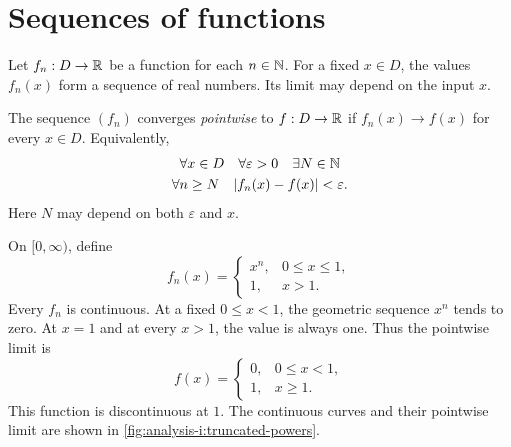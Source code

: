 \section{Sequences of functions}
\label{sec:analysis-i:sequences-of-functions}

Let $f_n:D\to\mathbb{R}$ be a function for each $n\in\mathbb{N}$. For a fixed $x\in D$,
the values $f_n(x)$ form a sequence of real numbers. Its limit may depend
on the input $x$.

\begin{definition}
  \label{thm:analysis-i:pointwise-convergence}
  The sequence $(f_n)$ converges \emph{pointwise} to $f:D\to\mathbb{R}$ if
  $f_n(x)\to f(x)$ for every $x\in D$. Equivalently,
  \[
    \begin{gathered}
      \forall x\in D\quad\forall\varepsilon>0\quad\exists N\in\mathbb{N}\\
      \forall n\ge N\quad |f_n(x)-f(x)|<\varepsilon.
    \end{gathered}
  \]
  Here $N$ may depend on both $\varepsilon$ and $x$.
\end{definition}

\begin{example}
  \label{ex:analysis-i:truncated-powers}
  On $[0,\infty)$, define
  \[
    f_n(x)=
    \begin{cases}
      x^n,&0\le x\le1,\\
      1,&x>1.
    \end{cases}
  \]
  Every $f_n$ is continuous. At a fixed $0\le x<1$, the geometric
  sequence $x^n$ tends to zero. At $x=1$ and at every $x>1$, the value
  is always one. Thus the pointwise limit is
  \[
    f(x)=
    \begin{cases}
      0,&0\le x<1,\\
      1,&x\ge1.
    \end{cases}
  \]
  This function is discontinuous at $1$. The continuous curves and
  their pointwise limit are shown in
  \autoref{fig:analysis-i:truncated-powers}.
\end{example}

\begin{marginfigure}
  \centering
  
  \caption[Truncated powers and their pointwise limit.]{Truncated powers for $n=2$ (gray) and $n=16$
    (black). The dashed graph is the pointwise limit. Its value at $1$
    is one.}
  \label{fig:analysis-i:truncated-powers}
\end{marginfigure}

